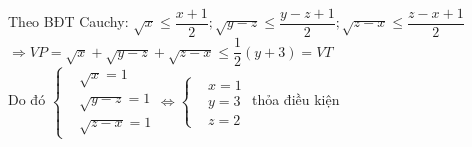 \begin{ex}
{\begin{enumerate}
			Theo BĐT Cauchy: $\sqrt{x}\le \dfrac{x+1}{2};\sqrt{y-z}\le \dfrac{y-z+1}{2};\sqrt{z-x}\le \dfrac{z-x+1}{2}$\\
			$\Rightarrow VP=\sqrt{x}+\sqrt{y-z}+\sqrt{z-x}\le \dfrac{1}{2}(y+3)=VT$\\
			Do đó $\begin{cases}
					& \sqrt{x}=1 \\ 
					& \sqrt{y-z}=1 \\ 
					& \sqrt{z-x}=1 
				\end{cases} 
				\Leftrightarrow \begin{cases}
									& x=1 \\ 
									& y=3 \\ 
									& z=2 
								\end{cases}$ thỏa điều kiện
			
		\end{enumerate}
	}

\end{ex}

